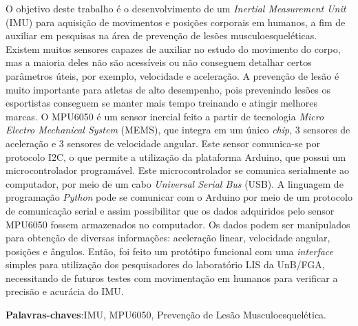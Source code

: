 \begin{resumo}
 
 \noindent
 O objetivo deste trabalho é o desenvolvimento de um \textit{Inertial Measurement Unit} (IMU) para aquisição de movimentos e posições corporais em humanos, a fim de auxiliar em pesquisas na área de prevenção de lesões musculoesqueléticas. Existem muitos sensores capazes de auxiliar no estudo do movimento do corpo, mas a maioria deles não são acessíveis ou não conseguem detalhar certos parâmetros úteis, por exemplo, velocidade e aceleração. A prevenção de lesão é muito importante para atletas de alto desempenho, pois prevenindo lesões os esportistas conseguem se manter mais tempo treinando e atingir melhores marcas. O MPU6050 é um sensor inercial feito a partir de tecnologia \textit{Micro Electro Mechanical System} (MEMS), que integra em um único \textit{chip}, 3 sensores de aceleração e 3 sensores de velocidade angular. Este sensor comunica-se por protocolo I2C, o que permite a utilização da plataforma Arduino, que possui um microcontrolador programável. Este microcontrolador se comunica serialmente ao computador, por meio de um cabo \textit{Universal  Serial Bus} (USB). A linguagem de programação \textit{Python} pode se comunicar com o Arduino por meio de um protocolo de comunicação serial e assim possibilitar que os dados adquiridos pelo sensor MPU6050 fossem armazenados no computador. Os dados podem ser manipulados para obtenção de diversas informações: aceleração linear, velocidade angular, posições e ângulos. Então, foi feito um protótipo funcional com uma \textit{interface} simples para utilização dos pesquisadores do laboratório LIS da UnB/FGA, necessitando de futuros testes com movimentação em humanos para verificar a precisão e acurácia do IMU. 
 
 \vspace{\onelineskip}
 \textbf{Palavras-chaves}:IMU, MPU6050, Prevenção de Lesão Musculoesquelética.
\end{resumo}
